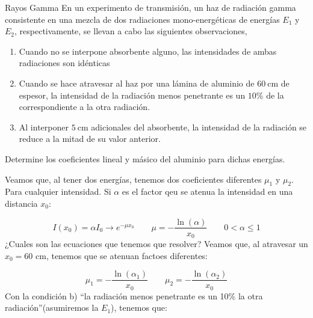 
\begin{Ejercicio}{Rayos Gamma}
En un experimento de transmisión, un haz de radiación gamma consistente en una mezcla de dos radiaciones mono-energéticas de energías $E_{1}$ y $E_{2}$, respectivamente, se llevan a cabo las siguientes observaciones,

\begin{enumerate}[label=\alph*)]
\item Cuando no se interpone absorbente alguno, las intensidades de ambas radiaciones son idénticas
\item Cuando se hace atravesar al haz por una lámina de aluminio de $60\ \text{cm}$ de espesor, la intensidad de la radiación menos penetrante es un $10\%$ de la correspondiente a la otra radiación.
\item Al interponer $5\ \text{cm}$ adicionales del absorbente, la intensidad de la radiación se reduce a la mitad de su valor anterior.
\end{enumerate}

Determine los coeficientes lineal y másico del aluminio para dichas energías.
\end{Ejercicio}

Veamos que, al tener dos energías, tenemos dos coeficientes diferentes $\mu_1$ y $\mu_2$. Para cualquier intensidad. Si $\alpha$ es el factor qeu se atenua la intensidad en una distancia $x_0$:

\begin{equation}
    I(x_0) = \alpha I_0 \to  e^{-\mu x_0}  \qquad \mu = - \frac{\ln(\alpha)}{x_0}\qquad  0 < \alpha \leq 1
\end{equation}
¿Cuales son las ecuaciones que tenemos que resolver? Veamos que, al atravesar un $x_0=60$ cm, tenemos que se atenuan factoes diferentes: 

\begin{equation}
    \mu_1 = -\frac{\ln (\alpha_1)}{x_0} \qquad 
    \mu_2 = -\frac{\ln (\alpha_2)}{x_0} 
\end{equation}
Con la condición b) ``la radiación menos penetrante es un 10\% la otra radiación''(asumiremos la $E_1$), tenemos que:

